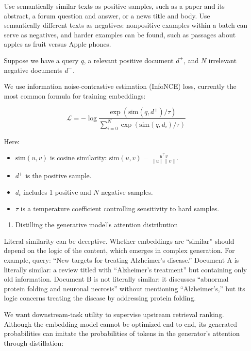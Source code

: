 Use semantically similar texts as positive samples, such as a paper and its abstract, a forum question and answer, or a news title and body. Use semantically different texts as negatives: nonpositive examples within a batch can serve as negatives, and harder examples can be found, such as passages about apples as fruit versus Apple phones.

Suppose we have a query \(q\), a relevant positive document \(d^+\), and \(N\) irrelevant negative documents \(d^-\).

We use information noise-contrastive estimation (InfoNCE) loss, currently the most common formula for training embeddings:

\[
\mathcal{L}=-\log\frac{\exp(\mathrm{sim}(q,d^+)/\tau)}{\sum_{i=0}^{N}\exp(\mathrm{sim}(q,d_i)/\tau)}
\]

Here:

\begin{itemize}
\tightlist
\item
  \(\mathrm{sim}(u,v)\) is cosine similarity: \(\mathrm{sim}(u,v)=\frac{u^\top v}{\lVert u\rVert\lVert v\rVert}\).
\item
  \(d^+\) is the positive sample.
\item
  \(d_i\) includes 1 positive and \(N\) negative samples.
\item
  \(\tau\) is a temperature coefficient controlling sensitivity to hard samples.
\end{itemize}

\begin{enumerate}
\def\labelenumi{\arabic{enumi}.}
\setcounter{enumi}{1}
\tightlist
\item
  Distilling the generative model's attention distribution
\end{enumerate}

Literal similarity can be deceptive. Whether embeddings are ``similar'' should depend on the logic of the content, which emerges in complex generation. For example, query: ``New targets for treating Alzheimer's disease.'' Document A is literally similar: a review titled with ``Alzheimer's treatment'' but containing only old information. Document B is not literally similar: it discusses ``abnormal protein folding and neuronal necrosis'' without mentioning ``Alzheimer's,'' but its logic concerns treating the disease by addressing protein folding.

We want downstream-task utility to supervise upstream retrieval ranking. Although the embedding model cannot be optimized end to end, its generated probabilities can imitate the probabilities of tokens in the generator's attention through distillation:

